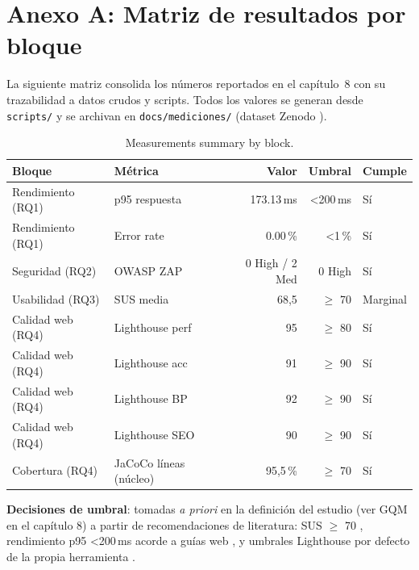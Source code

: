 \clearpage
\chapter*{Anexo A: Matriz de resultados por bloque}

La siguiente matriz consolida los números reportados en el capítulo~8 con su
trazabilidad a datos crudos y scripts. Todos los valores se generan desde
\texttt{scripts/} y se archivan en \texttt{docs/mediciones/} (dataset Zenodo
\cite{dataset_sgroas}).

\begin{table}[H]
\centering
\small
\caption{Measurements summary by block.}
\begin{tabular}{@{}llrrl@{}}
\toprule
\textbf{Bloque} & \textbf{Métrica} & \textbf{Valor} & \textbf{Umbral} & \textbf{Cumple} \\
\midrule
Rendimiento (RQ1) & p95 respuesta & 173.13\,ms & \textless 200\,ms & Sí \\
Rendimiento (RQ1) & Error rate & 0.00\,\% & \textless 1\,\% & Sí \\
Seguridad (RQ2) & OWASP ZAP & 0 High / 2 Med & 0 High & Sí \\
Usabilidad (RQ3) & SUS media & 68,5 & $\geq$ 70 & Marginal \\
Calidad web (RQ4) & Lighthouse perf & 95 & $\geq$ 80 & Sí \\
Calidad web (RQ4) & Lighthouse acc & 91 & $\geq$ 90 & Sí \\
Calidad web (RQ4) & Lighthouse BP & 92 & $\geq$ 90 & Sí \\
Calidad web (RQ4) & Lighthouse SEO & 90 & $\geq$ 90 & Sí \\
Cobertura (RQ4) & JaCoCo líneas (núcleo) & 95,5\,\% & $\geq$ 70 & Sí \\
\bottomrule
\end{tabular}
\end{table}

\textbf{Decisiones de umbral}: tomadas \emph{a priori} en la definición del
estudio (ver GQM en el capítulo 8) a partir de recomendaciones de literatura:
SUS $\geq$ 70 \cite{bangor2009}, rendimiento p95 \textless 200\,ms acorde a
guías web \cite{foo2015}, y umbrales Lighthouse por defecto de la propia
herramienta \cite{lighthouse}.


